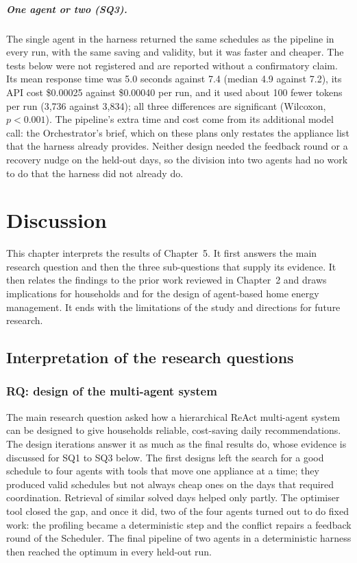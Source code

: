 \documentclass[12pt,a4paper]{report}
\begin{document}
\paragraph{One agent or two (SQ3).} The single agent in the harness
returned the same schedules as the pipeline in every run, with the same
saving and validity, but it was faster and cheaper. The tests below were
not registered and are reported without a confirmatory claim. Its mean response time was
5.0 seconds against 7.4 (median 4.9 against 7.2), its API cost
\$0.00025 against \$0.00040 per run, and it used about 100 fewer tokens
per run (3,736 against 3,834); all three differences are significant
(Wilcoxon, $p < 0.001$). The pipeline's extra time and cost come from
its additional model call: the Orchestrator's brief, which on these
plans only restates the appliance list that the harness already
provides. Neither design needed the feedback round or a recovery nudge
on the held-out days, so the division into two agents had no work to do
that the harness did not already do.

\chapter{Discussion}
\label{ch:discussion}

This chapter interprets the results of Chapter~5. It first answers the
main research question and then the three sub-questions that supply its
evidence. It then relates the findings to the prior work reviewed in
Chapter~2 and draws implications
for households and for the design of agent-based home energy
management. It ends with the limitations of the study and directions for
future research.

\section{Interpretation of the research questions}
\label{sec:discussion-rq}

\subsection{RQ: design of the multi-agent system}

The main research question asked how a hierarchical ReAct multi-agent
system can be designed to give households reliable, cost-saving daily
recommendations. The design iterations answer it as much as the final
results do, whose evidence is discussed for SQ1 to SQ3 below. The first designs left the search for a good schedule to
four agents with tools that move one appliance at a time; they produced
valid schedules but not always cheap ones on the days that required
coordination. Retrieval of similar solved days helped only partly. The
optimiser tool closed the gap, and once it did, two of the four agents
turned out to do fixed work: the profiling became a deterministic step
and the conflict repairs a feedback round of the Scheduler. The final
pipeline of two agents in a deterministic harness then reached the
optimum in every held-out run.
\end{document}
